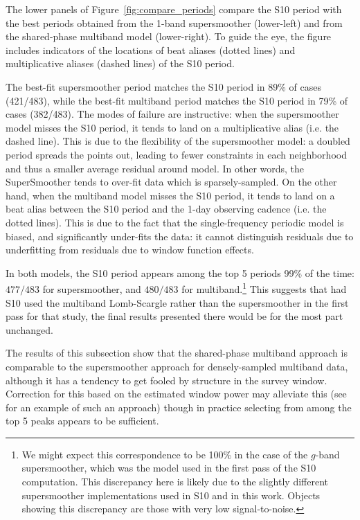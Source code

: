 \documentclass[12pt,preprint]{aastex}
\newcommand{\Fig}[1]{Figure~\ref{fig:#1}}
\newcommand{\fig}[1]{\Fig{#1}}
\begin{document}
The lower panels of \fig{compare_periods} compare the S10 period with the best periods obtained from the 1-band supersmoother (lower-left) and from the shared-phase multiband model (lower-right). To guide the eye, the figure includes indicators of the locations of beat aliases (dotted lines) and multiplicative aliases (dashed lines) of the S10 period.

The best-fit supersmoother period matches the S10 period in 89\% of cases (421/483), while the best-fit multiband period matches the S10 period in 79\% of cases (382/483). The modes of failure are instructive: when the supersmoother model misses the S10 period, it tends to land on a multiplicative alias (i.e. the dashed line). This is due to the flexibility of the supersmoother model: a doubled period spreads the points out, leading to fewer constraints in each neighborhood and thus a smaller average residual around model. In other words, the SuperSmoother tends to over-fit data which is sparsely-sampled. On the other hand, when the multiband model misses the S10 period, it tends to land on a beat alias between the S10 period and the 1-day observing cadence (i.e. the dotted lines). This is due to the fact that the single-frequency periodic model is biased, and significantly under-fits the data: it cannot distinguish residuals due to underfitting from residuals due to window function effects.

In both models, the S10 period appears among the top 5 periods 99\% of the time: $477/483$ for supersmoother, and $480/483$ for multiband.\footnote{We might expect this correspondence to be 100\% in the case of the $g$-band supersmoother, which was the model used in the first pass of the S10 computation. This discrepancy here is likely due to the slightly different supersmoother implementations used in S10 and in this work. Objects showing this discrepancy are those with very low signal-to-noise.} This suggests that had S10 used the multiband Lomb-Scargle rather than the supersmoother in the first pass for that study, the final results presented there would be for the most part unchanged.

The results of this subsection show that the shared-phase multiband approach is comparable to the supersmoother approach for densely-sampled multiband data, although it has a tendency to get fooled by structure in the survey window. Correction for this based on the estimated window power may alleviate this (see \citet{Roberts87} for an example of such an approach) though in practice selecting from among the top 5 peaks appears to be sufficient.
\end{document}
